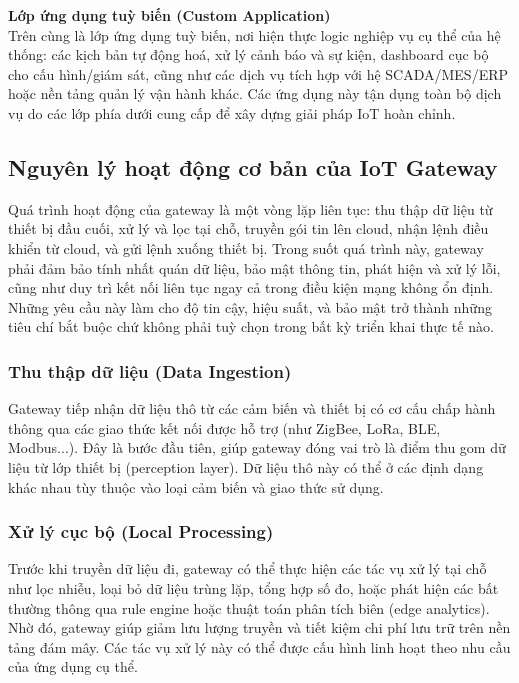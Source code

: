                     \textbf{Lớp ứng dụng tuỳ biến (Custom Application)}\\
                        Trên cùng là lớp ứng dụng tuỳ biến, nơi hiện thực logic nghiệp vụ cụ thể của hệ thống: các kịch bản tự động hoá, xử lý cảnh báo và sự kiện, dashboard cục bộ cho cấu hình/giám sát, cũng như các dịch vụ tích hợp với hệ SCADA/MES/ERP hoặc nền tảng quản lý vận hành khác. Các ứng dụng này tận dụng toàn bộ dịch vụ do các lớp phía dưới cung cấp để xây dựng giải pháp IoT hoàn chỉnh.

        \subsection{Nguyên lý hoạt động cơ bản của IoT Gateway}
            Quá trình hoạt động của gateway là một vòng lặp liên tục: thu thập dữ liệu từ thiết bị đầu cuối, xử lý và lọc tại chỗ, truyền gói tin lên cloud, nhận lệnh điều khiển từ cloud, và gửi lệnh xuống thiết bị. Trong suốt quá trình này, gateway phải đảm bảo tính nhất quán dữ liệu, bảo mật thông tin, phát hiện và xử lý lỗi, cũng như duy trì kết nối liên tục ngay cả trong điều kiện mạng không ổn định. Những yêu cầu này làm cho độ tin cậy, hiệu suất, và bảo mật trở thành những tiêu chí bắt buộc chứ không phải tuỳ chọn trong bất kỳ triển khai thực tế nào.
                \subsubsection*{Thu thập dữ liệu (Data Ingestion)}
                    Gateway tiếp nhận dữ liệu thô từ các cảm biến và thiết bị có cơ cấu chấp hành thông qua các giao thức kết nối được hỗ trợ (như ZigBee, LoRa, BLE, Modbus...). Đây là bước đầu tiên, giúp gateway đóng vai trò là điểm thu gom dữ liệu từ lớp thiết bị (perception layer). Dữ liệu thô này có thể ở các định dạng khác nhau tùy thuộc vào loại cảm biến và giao thức sử dụng.
                \subsubsection*{Xử lý cục bộ (Local Processing)}
                    Trước khi truyền dữ liệu đi, gateway có thể thực hiện các tác vụ xử lý tại chỗ như lọc nhiễu, loại bỏ dữ liệu trùng lặp, tổng hợp số đo, hoặc phát hiện các bất thường thông qua rule engine hoặc thuật toán phân tích biên (edge analytics). Nhờ đó, gateway giúp giảm lưu lượng truyền và tiết kiệm chi phí lưu trữ trên nền tảng đám mây. Các tác vụ xử lý này có thể được cấu hình linh hoạt theo nhu cầu của ứng dụng cụ thể.
